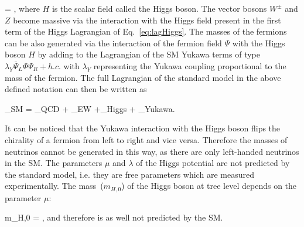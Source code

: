 {
    \Phi = ,
}
where $H$ is the scalar field called the Higgs boson. The vector bosons $W^{\pm}$ and $Z$ become massive via the interaction with the Higgs field present in the first term of the Higgs Lagrangian of Eq.~\ref{eq:lagHiggs}. The masses of the fermions can be also generated via the interaction of the fermion field  $\Psi$ with the Higgs boson $H$ by adding  to the Lagrangian of the SM Yukawa terms of type $\lambda_{Y} \bar{\Psi}_{L} \Phi \Psi_{R} + h.c.$ with $\lambda_{Y}$ representing the Yukawa coupling proportional to the mass of the fermion. The full Lagrangian of the standard model in the above defined notation can then be written as

{
 _{SM} = _{QCD} + _{EW} +_{Higgs} + _{Yukawa}.
} 

It can be noticed  that the Yukawa interaction with the Higgs boson flips the chirality of a fermion from left to right and vice versa. Therefore the masses of neutrinos cannot be generated in this way, as there are only left-handed neutrinos in the SM. The parameters $\mu$ and $\lambda$ of the Higgs potential are not predicted by the standard model, i.e. they are free parameters which are measured experimentally. The mass~($m_{H,0}$) of the Higgs boson at tree level depends on the parameter $\mu$: 

{
m_{H,0} = \mu,
}
and therefore is as well not predicted by the SM. 


